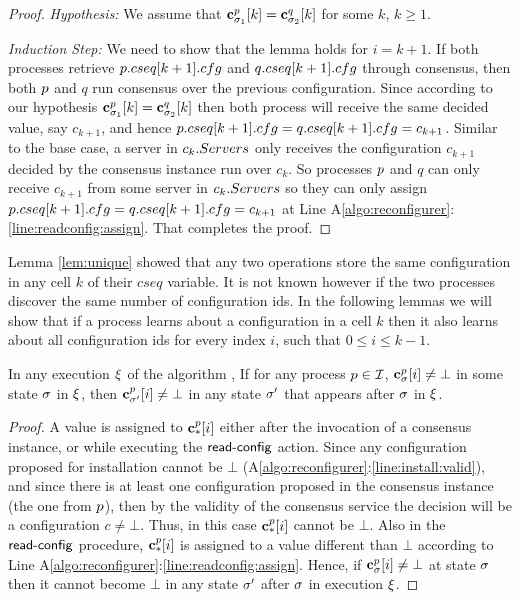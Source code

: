 \begin{proof}
     \emph{Hypothesis:} We assume  that 
	$\mathbf{c}^{p}_{\sigma_1}[k]=\mathbf{c}^{q}_{\sigma_2}[k]$  for some $k$, $k \geq 1$.
	
	\emph{Induction Step:}  We need to show that the lemma holds for $i=k+1$.
	If both processes retrieve $p.cseq[k+1].cfg$ and $q.cseq[k+1].cfg$ through consensus, 
	then both $p$ and $q$ run consensus
	over the previous configuration. Since according to our hypothesis 
	$\mathbf{c}^{p}_{\sigma_1}[k]=\mathbf{c}^{q}_{\sigma_2}[k]$ then both process will receive the same
	decided value, say $c_{k+1}$, and hence $p.cseq[k+1].cfg=q.cseq[k+1].cfg=c_{k+1}$. Similar to the base case,
	a server in $c_k.Servers$ only receives the configuration $c_{k+1}$ decided by the consensus instance run over $c_k$. 
	So processes 
	$p$ and $q$ can only receive $c_{k+1}$ from some server in $c_k.Servers$ 
	so they can only assign $p.cseq[k+1].cfg=q.cseq[k+1].cfg=c_{k+1}$ at Line A\ref{algo:reconfigurer}:\ref{line:readconfig:assign}.
	That completes the proof. 
\end{proof}


Lemma \ref{lem:unique} showed that any two operations store the same
configuration in any cell $k$ of their $cseq$ variable. It is not known however 
if the two processes discover the same number of configuration ids. In the following
lemmas we will show that if a process learns about a configuration in a cell $k$ 
then it also learns about all configuration ids for every index $i$, such that $0\leq i\leq k-1$.

\begin{lemma}
\label{lem:confmonotonic}
	In any execution $\EX$ of the algorithm , If for any process $p\in\mathcal{I}$, $\mathbf{c}^{p}_{\sigma}[i]\neq\bot$ in some state $\sigma$ in $\EX$,
	then $\mathbf{c}^{p}_{\sigma'}[i]\neq\bot$ in any state $\sigma'$ that appears after $\sigma$ in $\EX$. 
\end{lemma}

\begin{proof}
	A value is assigned to $\mathbf{c}^{p}_{*}[i]$ either after the invocation of a consensus instance, or while executing
	the $\act{read-config}$ action. Since any configuration proposed for installation cannot be $\bot$ (A\ref{algo:reconfigurer}:\ref{line:install:valid}), 
	and since there is at least one configuration proposed in the consensus instance (the one from $p$), then by the validity of the consensus
	service the decision will be a configuration $c\neq\bot$. Thus, in this case $\mathbf{c}^{p}_{*}[i]$ cannot be $\bot$.
	Also in the $\act{read-config}$ procedure, $\mathbf{c}^{p}_{*}[i]$ is assigned to a value different than $\bot$ according
	to Line A\ref{algo:reconfigurer}:\ref{line:readconfig:assign}. Hence, if $\mathbf{c}^{p}_{\sigma}[i]\neq\bot$ at state $\sigma$ 
	then it cannot become $\bot$ in any state $\sigma'$ after $\sigma$ in execution $\EX$.
\end{proof}


